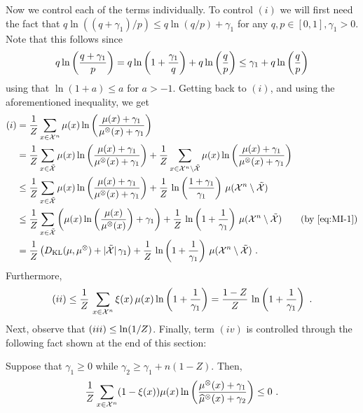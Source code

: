 %
Now we control each of the terms individually.
%
To control $(i)$ we will first need the fact that $q \ln((q+\gamma_1)/p) \leq q \ln(q/p) + \gamma_1$ for any $q,p \in [0,1], \gamma_1 > 0$.
Note that this follows since
\begin{align}
  \label{eq:MI-1}
  q \ln\left( \frac{q+\gamma_1}{p} \right)
  = q \ln\left( 1+\frac{\gamma_1}{q} \right) + q \ln\left( \frac{q}{p} \right)
  \le \gamma_1 + q \ln\left( \frac{q}{p} \right)
\end{align}
using that $\ln(1+a) \le a$ for $a > -1$.
Getting back to $(i)$, and using the aforementioned inequality, we get
\begin{align*}
  (i) &= \frac{1}{\Normfactor}\sum_{\sample \in \cX^n} \mu(\sample) \ln \pr{ \frac{\mu(\sample) + \gamma_1}{\mu^{\otimes}(\sample) + \gamma_1}}\\
      &= \frac{1}{\Normfactor}\sum_{\sample \in \tilde{\cX}} \mu(\sample) \ln \pr{ \frac{\mu(\sample) + \gamma_1}{\mu^{\otimes}(\sample) + \gamma_1}}
        + \frac{1}{\Normfactor}\sum_{\sample \in \cX^n \setminus \tilde{\cX}} \mu(\sample) \ln \pr{ \frac{\mu(\sample) + \gamma_1}{\mu^{\otimes}(\sample) + \gamma_1}}\\
      &\leq \frac{1}{\Normfactor}\sum_{\sample \in \tilde{\cX}} \mu(\sample) \ln \pr{ \frac{\mu(\sample) + \gamma_1}{\mu^{\otimes}(\sample) + \gamma_1}}
        + \frac{1}{\Normfactor} \, \ln \pr{ \frac{1 + \gamma_1}{\gamma_1}} \, \mu(\cX^n \setminus \tilde{\cX}) \\
  &\le
    \frac{1}{\Normfactor} \sum_{\sample \in \tilde \cX} \pr{ \mu(\sample) \ln \pr{ \frac{\mu(\sample)}{\mu^{\otimes}(\sample)}} + \gamma_1 }
    +
    \frac{1}{\Normfactor} \, \ln \pr{1+\frac{1}{\gamma_1}} \, \mu(\cX^n \setminus \tilde{\cX})
    \tag{by \Cref{eq:MI-1}}\\
&= \frac{1}{\Normfactor}\left(D_{\KL}(\mu, \mu^{\otimes}) + |\tilde \cX| \, \gamma_1\right)
        +
    \frac{1}{\Normfactor} \, \ln \pr{1+\frac{1}{\gamma_1}} \, \mu(\cX^n \setminus \tilde{\cX})~.
\end{align*}
%
Furthermore,
\begin{align*}
  (ii)
  \leq
  \frac{1}{Z} \, \sum_{x \in {\mathcal{X}}^n} \xi(x) \, \mu(x) \ln \left( 1 + \frac{1}{\gamma_1} \right)
  =
  \frac{1-Z}{Z} \, \ln \left( 1 + \frac{1}{\gamma_1} \right)~.
\end{align*}
%
Next, observe that $(iii) \leq \ln(1/Z)$.
Finally, term $(iv)$ is controlled through the following fact shown at the end of this section:
\begin{lemma}
  \label{lem:controlling-product-mu-gap}
  Suppose that $\gamma_1 \geq 0$ while $\gamma_2 \geq \gamma_1 + n (1-Z)$.
  Then,
  \begin{align*}
    \frac{1}{Z}\sum_{x \in {\mathcal{X}}^n} (1-\xi(x)) \mu(x) \ln \left(  \frac{\mu^{\otimes}(x) + \gamma_1}{\widehat \mu^{\otimes}(x) + \gamma_2} \right)
    \leq 0~.
  \end{align*}
\end{lemma}
